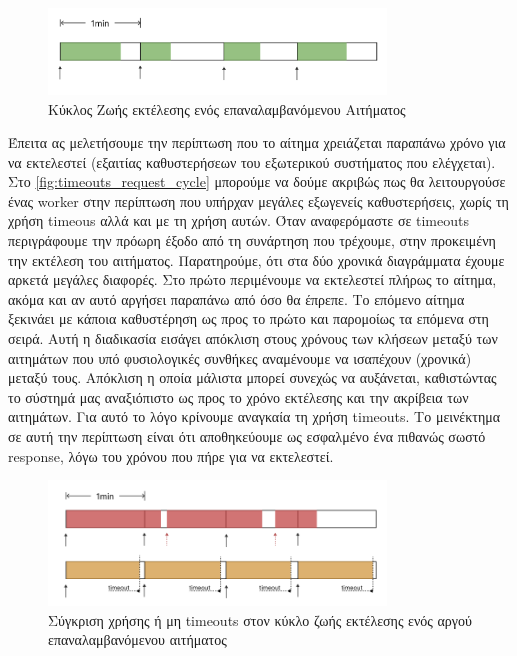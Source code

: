 \begin{figure}[!ht]
	\centering
	\includegraphics[width=0.8\textwidth]{./images/chapter4/perfect_request_cycle.png}
	\caption[Κύκλος Ζωής εκτέλεσης ενός επαναλαμβανόμενου Αιτήματος]{Κύκλος Ζωής εκτέλεσης ενός επαναλαμβανόμενου Αιτήματος}
	\label{fig:perfect_request_cycle}
\end{figure}

Έπειτα ας μελετήσουμε την περίπτωση που το αίτημα χρειάζεται παραπάνω χρόνο για να εκτελεστεί (εξαιτίας καθυστερήσεων του εξωτερικού συστήματος που ελέγχεται).
Στο \autoref{fig:timeouts_request_cycle} μπορούμε να δούμε ακριβώς πως θα λειτουργούσε ένας worker στην περίπτωση που υπήρχαν μεγάλες εξωγενείς καθυστερήσεις, χωρίς τη χρήση
timeous αλλά και με τη χρήση αυτών. Όταν αναφερόμαστε σε timeouts περιγράφουμε την πρόωρη έξοδο από τη συνάρτηση που τρέχουμε, στην
προκειμένη την εκτέλεση του αιτήματος. Παρατηρούμε, ότι στα δύο χρονικά διαγράμματα έχουμε αρκετά μεγάλες διαφορές.
Στο πρώτο περιμένουμε να εκτελεστεί πλήρως το αίτημα, ακόμα και αν αυτό αργήσει παραπάνω από όσο
θα έπρεπε. Το επόμενο αίτημα ξεκινάει με κάποια καθυστέρηση ως προς το πρώτο και παρομοίως τα επόμενα στη σειρά.
Αυτή η διαδικασία εισάγει απόκλιση στους χρόνους των κλήσεων μεταξύ των αιτημάτων που υπό φυσιολογικές συνθήκες αναμένουμε να ισαπέχουν (χρονικά) μεταξύ τους.
Απόκλιση η οποία μάλιστα μπορεί συνεχώς να αυξάνεται, καθιστώντας το σύστημά μας αναξιόπιστο ως προς
το χρόνο εκτέλεσης και την ακρίβεια των αιτημάτων. Για αυτό το λόγο κρίνουμε αναγκαία τη χρήση timeouts.
Το μεινέκτημα σε αυτή την περίπτωση είναι ότι αποθηκεύουμε ως εσφαλμένο ένα πιθανώς σωστό response, λόγω του χρόνου που πήρε για να εκτελεστεί.

\begin{figure}[!ht]
	\centering
	\includegraphics[width=0.8\textwidth]{./images/chapter4/timeout_request_cycle.png}
	\caption[Σύγκριση χρήσης ή μη timeouts στον κύκλο ζωής εκτέλεσης ενός αργού επαναλαμβανόμενου αιτήματος]{Σύγκριση χρήσης ή μη timeouts στον κύκλο ζωής εκτέλεσης ενός αργού επαναλαμβανόμενου αιτήματος}
	\label{fig:timeouts_request_cycle}
\end{figure}

